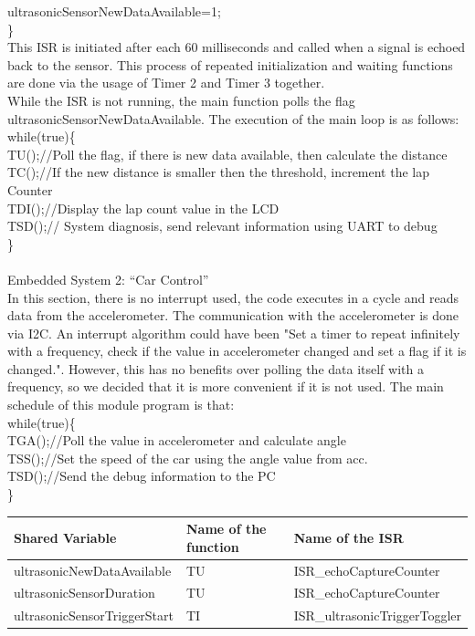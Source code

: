 \documentclass{article}
\begin{document}
ultrasonicSensorNewDataAvailable=1; \\
\}\\
This ISR is initiated after each 60 milliseconds and called when a signal is echoed back to the sensor.
This process of repeated initialization and waiting functions are done via the usage of Timer 2 and Timer 3
together.\\
While the ISR is not running, the main function polls the flag ultrasonicSensorNewDataAvailable.
The execution of the main loop is as follows:\\
while(true)\{\\
TU();//Poll the flag, if there is new data available, then calculate the distance\\
TC();//If the new distance is smaller then the threshold, increment the lap Counter\\
TDI();//Display the lap count value in the LCD\\
TSD();// System diagnosis, send relevant information using UART to debug\\
\}\\
\\
{\huge {Embedded System 2: “Car Control”}}
\\
In this section, there is no interrupt used, the code executes in a cycle and reads data from the
accelerometer. The communication with the accelerometer is done via I2C. An interrupt algorithm could have
been "Set a timer to repeat infinitely with a frequency, check if the value in accelerometer changed and
set a flag if it is changed.". However, this has no benefits over polling the data itself with a frequency,
so we decided that it is more convenient if it is not used. The main schedule of this module program is that:\\
while(true)\{\\
TGA();//Poll the value in accelerometer and calculate angle\\
TSS();//Set the speed of the car using the angle value from acc.\\
TSD();//Send the debug information to the PC\\
\}
\\[0.5in]
\begin{tabular}{| C{4cm} | C{4cm} | C{5cm} |}
\hline
Shared Variable&Name of the function&Name of the ISR\\
\hline
ultrasonicNewDataAvailable&TU& ISR\_echoCaptureCounter\\
\hline
ultrasonicSensorDuration&TU&ISR\_echoCaptureCounter\\
\hline
ultrasonicSensorTriggerStart&TI&ISR\_ultrasonicTriggerToggler\\
\hline
\end{tabular}
\end{document}
